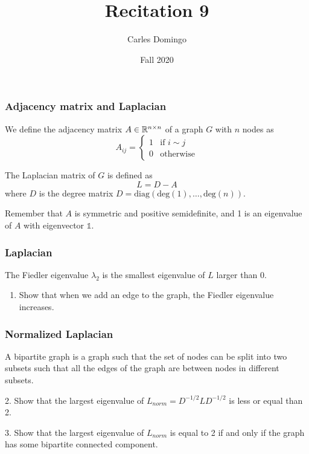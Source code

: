 \documentclass{beamer}
\title{Recitation 9}
\author{Carles Domingo}
\date{Fall 2020}
\begin{document}
\frame{\titlepage} 

\setcounter{showProgressBar}{0}
\setcounter{showSlideNumbers}{1}

\begin{frame}[t]
\frametitle{Adjacency matrix and Laplacian}
\begin{definition}
We define the adjacency matrix $A \in \mathbb{R}^{n \times n}$ of a graph $G$ with $n$ nodes as
\begin{equation*} 
A_{ij} = \begin{cases}
1 &\text{if } i \sim j \\
0 &\text{otherwise}
\end{cases}
\end{equation*}
\end{definition}

\begin{definition}
The Laplacian matrix of $G$ is defined as
\begin{equation*} 
L = D - A
\end{equation*}
where $D$ is the degree matrix $D = \text{diag}(\text{deg}(1), \dots, \text{deg}(n))$.
\end{definition}
Remember that $A$ is symmetric and positive semidefinite, and 1 is an eigenvalue of $A$ with eigenvector $\mathds{1}$.
\end{frame}

\begin{frame}[t]
\frametitle{Laplacian}
The Fiedler eigenvalue $\lambda_2$ is the smallest eigenvalue of $L$ larger than 0.
\begin{enumerate}
\item Show that when we add an edge to the graph, the Fiedler eigenvalue increases.
\end{enumerate}
\pause
\end{frame}

\begin{frame}[t]
\frametitle{Normalized Laplacian}
\vspace{-10pt}
A bipartite graph is a graph such that the set of nodes can be split into two subsets such that all the edges of the graph are between nodes in different subsets.

2. Show that the largest eigenvalue of $L_{norm} = D^{-1/2} L D^{-1/2}$ is less or equal than 2.

3. Show that the largest eigenvalue of $L_{norm}$ is equal to 2 if and only if the graph has some bipartite connected component.
\pause
\pause
\end{frame}
\end{document}
